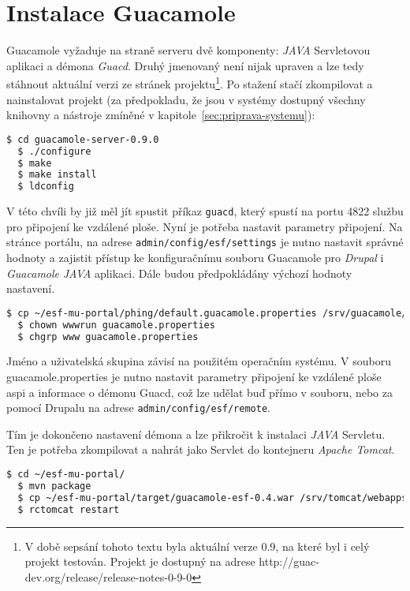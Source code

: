 \section{Instalace Guacamole}
Guacamole vyžaduje na straně serveru dvě komponenty: \emph{JAVA} Servletovou aplikaci a démona \emph{Guacd}. Druhý jmenovaný není nijak upraven a lze tedy stáhnout aktuální verzi ze stránek projektu\footnote{V době sepsání tohoto textu byla aktuální verze 0.9, na které byl i celý projekt testován. Projekt je dostupný na adrese http://guac-dev.org/release/release-notes-0-9-0}. Po stažení stačí zkompilovat a nainstalovat projekt (za předpokladu, že jsou v systémy dostupný všechny knihovny a nástroje zmíněné v kapitole~\ref{sec:priprava-systemu}):

\begin{lstlisting}[language=bash]
  $ cd guacamole-server-0.9.0
  $ ./configure
  $ make
  $ make install
  $ ldconfig
\end{lstlisting}

V této chvíli by již měl jít spustit příkaz \texttt{guacd}, který spustí na portu 4822 službu pro připojení ke vzdálené ploše. Nyní je potřeba nastavit parametry připojení. Na stránce portálu, na adrese \texttt{admin/config/esf/settings} je nutno nastavit správné hodnoty a zajistit přístup ke konfiguračnímu souboru Guacamole pro \emph{Drupal} i \emph{Guacamole} \emph{JAVA} aplikaci. Dále budou předpokládány výchozí hodnoty nastavení.

\begin{lstlisting}[language=bash]
  $ cp ~/esf-mu-portal/phing/default.guacamole.properties /srv/guacamole/guacamole.properties
  $ chown wwwrun guacamole.properties 
  $ chgrp www guacamole.properties 
\end{lstlisting}

Jméno a uživatelská skupina závisí na použitém operačním systému. V souboru guacamole.properties je nutno nastavit parametry připojení ke vzdálené ploše \gls{aspi} a informace o démonu Guacd, což lze udělat buď přímo v souboru, nebo za pomocí Drupalu na adrese \texttt{admin/config/esf/remote}. 

Tím je dokončeno nastavení démona a lze přikročit k instalaci \emph{JAVA} Servletu. Ten je potřeba zkompilovat a nahrát jako Servlet do kontejneru \emph{Apache Tomcat}.

\begin{lstlisting}[language=bash]
  $ cd ~/esf-mu-portal/
  $ mvn package
  $ cp ~/esf-mu-portal/target/guacamole-esf-0.4.war /srv/tomcat/webapps/
  $ rctomcat restart

\end{lstlisting}

